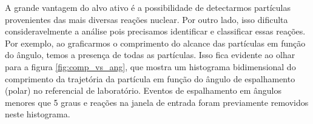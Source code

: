 \documentclass[a4paper,12pt,oneside]{book}
\begin{document}
\par A grande vantagem do alvo ativo é a possibilidade de detectarmos partículas provenientes das mais diversas reações nuclear. Por outro lado, isso dificulta consideravelmente a análise pois precisamos identificar e classificar essas reações. Por exemplo, ao graficarmos o comprimento do alcance das partículas em função do ângulo, temos a presença de todas as partículas. Isso fica evidente ao olhar para a figura \ref{fig:comp_vs_ang}, que mostra um histograma bidimensional do comprimento da trajetória da partícula em função do ângulo de espalhamento (polar) no referencial de laboratório. Eventos de espalhamento em ângulos menores que 5 graus e reações na janela de entrada foram previamente removidos neste histograma.


%


\end{document}
